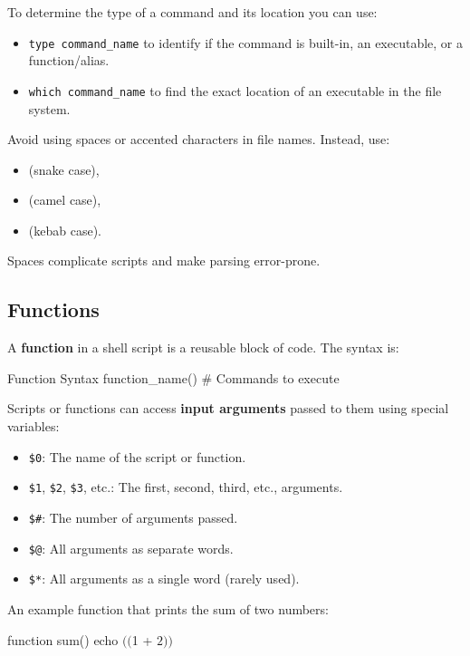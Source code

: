 To determine the type of a command and its location you can use:
\begin{itemize}
    \item \texttt{type command\_name} to identify if the command is built-in, an executable, or a function/alias.
    \item \texttt{which command\_name} to find the exact location of an executable in the file system.
\end{itemize}

\begin{warningblock}
    Avoid using spaces or accented characters in file names. Instead, use:
    \begin{itemize}
        \item {} (snake case),
        \item {} (camel case),
        \item {} (kebab case).
    \end{itemize}
    Spaces complicate scripts and make parsing error-prone.
\end{warningblock}

\subsection{Functions}

A \textbf{function} in a shell script is a reusable block of code. The syntax is:
\begin{neonlisting}[language=bash]{Function Syntax}
function_name() {
    # Commands to execute
}
\end{neonlisting}

Scripts or functions can access \textbf{input arguments} passed to them using special variables:
\begin{itemize}
    \item \texttt{\$0}: The name of the script or function.
    \item \texttt{\$1}, \texttt{\$2}, \texttt{\$3}, etc.: The first, second, third, etc., arguments.
    \item \texttt{\$\#}: The number of arguments passed.
    \item \texttt{\$@}: All arguments as separate words.
    \item \texttt{\$*}: All arguments as a single word (rarely used).
\end{itemize}

\begin{exampleblock}
    An example function that prints the sum of two numbers:
    \begin{codeblock}
function sum() {
    echo $(($1 + $2))$
}
    \end{codeblock}
\end{exampleblock}

